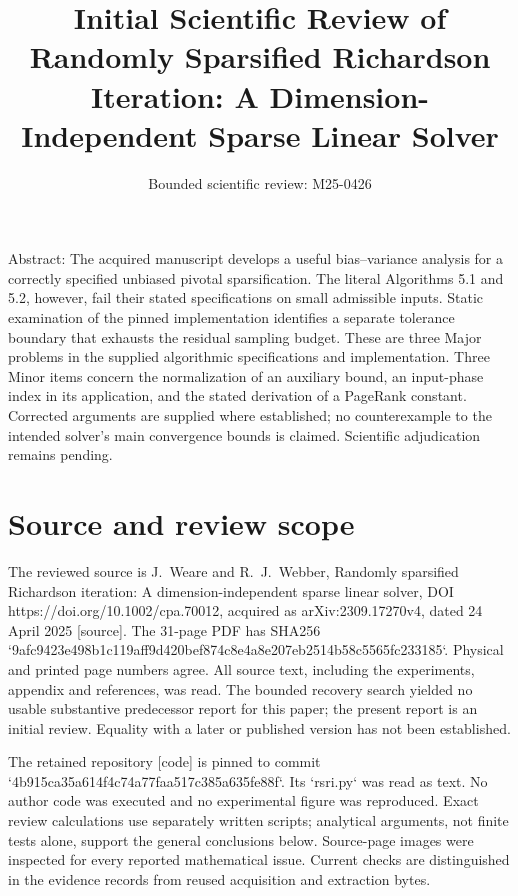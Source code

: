 \documentclass[10pt]{article}
\title{Initial Scientific Review of
Randomly Sparsified Richardson Iteration:
A Dimension-Independent Sparse Linear Solver}
\author{Bounded scientific review: M25-0426}
\date{}
\begin{document}
\maketitle
Abstract: The acquired manuscript develops a useful bias–variance analysis for a correctly specified unbiased pivotal sparsification. The literal Algorithms 5.1 and 5.2, however, fail their stated specifications on small admissible inputs. Static examination of the pinned implementation identifies a separate tolerance boundary that exhausts the residual sampling budget. These are three Major problems in the supplied algorithmic specifications and implementation. Three Minor items concern the normalization of an auxiliary bound, an input-phase index in its application, and the stated derivation of a PageRank constant. Corrected arguments are supplied where established; no counterexample to the intended solver’s main convergence bounds is claimed. Scientific adjudication remains pending.\par
\section*{Source and review scope}
The reviewed source is J. Weare and R. J. Webber, Randomly sparsified Richardson iteration: A dimension-independent sparse linear solver, DOI https://doi.org/10.1002/cpa.70012, acquired as arXiv:2309.17270v4, dated 24 April 2025 [source]. The 31-page PDF has SHA256 `9afc9423e498b1c119aff9d420bef874c8e4a8e207eb2514b58c5565fc233185`. Physical and printed page numbers agree. All source text, including the experiments, appendix and references, was read. The bounded recovery search yielded no usable substantive predecessor report for this paper; the present report is an initial review. Equality with a later or published version has not been established.\par
The retained repository [code] is pinned to commit `4b915ca35a614f4c74a77faa517c385a635fe88f`. Its `rsri.py` was read as text. No author code was executed and no experimental figure was reproduced. Exact review calculations use separately written scripts; analytical arguments, not finite tests alone, support the general conclusions below. Source-page images were inspected for every reported mathematical issue. Current checks are distinguished in the evidence records from reused acquisition and extraction bytes.\par
\end{document}
